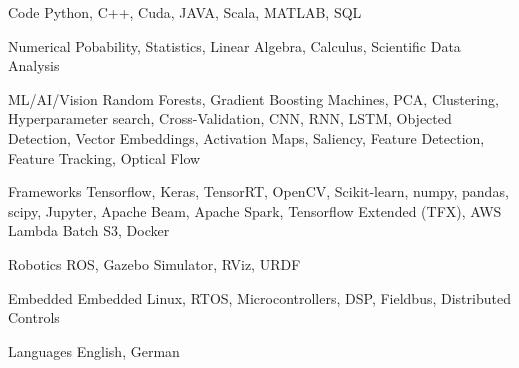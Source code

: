 

\begin{cvskills}

\cvskill
    {Code} %
    {Python, C++, Cuda, JAVA, Scala, MATLAB, SQL} %

\cvskill
    {Numerical} %
    {Pobability, Statistics, Linear Algebra, Calculus, Scientific Data Analysis} %

\cvskill
    {ML/AI/Vision} %
    {Random Forests, Gradient Boosting Machines, PCA, Clustering, Hyperparameter search, Cross-Validation,
    CNN, RNN, LSTM, Objected Detection, Vector Embeddings, Activation Maps, Saliency,
    Feature Detection, Feature Tracking, Optical Flow} %

\cvskill
    {Frameworks} %
    {Tensorflow, Keras, TensorRT, OpenCV, Scikit-learn, numpy, pandas, scipy, Jupyter,
    Apache Beam, Apache Spark, Tensorflow Extended (TFX), AWS Lambda Batch S3,
    Docker} %

\cvskill
    {Robotics} %
    {ROS, Gazebo Simulator, RViz, URDF} %

\cvskill
    {Embedded} %
    {Embedded Linux, RTOS, Microcontrollers, DSP, Fieldbus, Distributed Controls} %

  \cvskill
    {Languages} %
    {English, German} %

\end{cvskills}